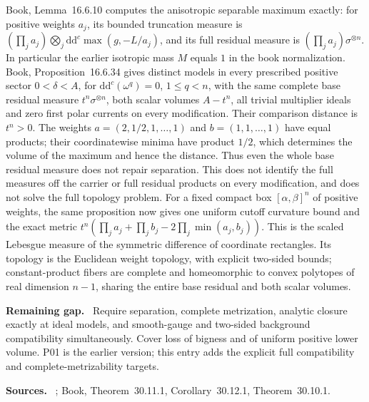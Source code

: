 \documentclass[11pt]{article}
\newcommand{\ddc}{\mathrm d\mathrm d^c}
\newcommand{\field}[1]{\par\medskip\noindent\textbf{#1.}\ }
\begin{document}
Book, Lemma~16.6.10 computes the anisotropic separable maximum exactly: for positive weights $a_j$, its bounded truncation measure is $(\prod_j a_j)\bigotimes_j\ddc\max(g,-L/a_j)$, and its full residual measure is $(\prod_j a_j)\sigma^{\otimes n}$. In particular the earlier isotropic mass $M$ equals $1$ in the book normalization. Book, Proposition~16.6.34 gives distinct models in every prescribed positive sector $0<\delta<A$, for $\ddc(\omega^q)=0$, $1\leq q<n$, with the same complete base residual measure $t^n\sigma^{\otimes n}$, both scalar volumes $A-t^n$, all trivial multiplier ideals and zero first polar currents on every modification. Their comparison distance is $t^n>0$. The weights $a=(2,1/2,1,\ldots,1)$ and $b=(1,1,\ldots,1)$ have equal products; their coordinatewise minima have product $1/2$, which determines the volume of the maximum and hence the distance. Thus even the whole base residual measure does not repair separation. This does not identify the full measures off the carrier or full residual products on every modification, and does not solve the full topology problem. For a fixed compact box $[\alpha,\beta]^n$ of positive weights, the same proposition now gives one uniform cutoff curvature bound and the exact metric $t^n(\prod_j a_j+\prod_j b_j-2\prod_j\min(a_j,b_j))$. This is the scaled Lebesgue measure of the symmetric difference of coordinate rectangles. Its topology is the Euclidean weight topology, with explicit two-sided bounds; constant-product fibers are complete and homeomorphic to convex polytopes of real dimension $n-1$, sharing the entire base residual and both scalar volumes.
\field{Remaining gap} Require separation, complete metrization, analytic closure exactly at ideal models, and smooth-gauge and two-sided background compatibility simultaneously. Cover loss of bigness and of uniform positive lower volume. P01 is the earlier version; this entry adds the explicit full compatibility and complete-metrizability targets.
\field{Sources} \cite{SGPT,XL26}; Book, Theorem~30.11.1, Corollary~30.12.1, Theorem~30.10.1.
\end{document}
